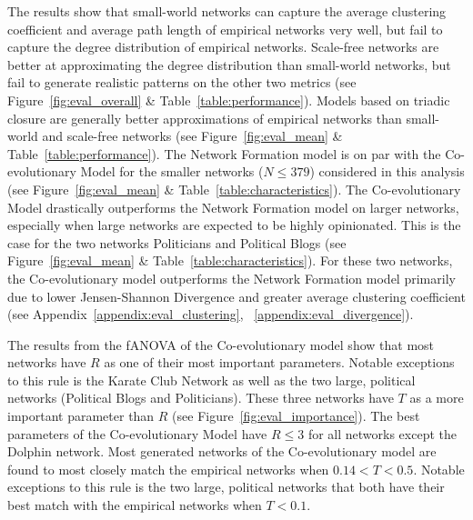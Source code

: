 \documentclass[11pt]{article}
\begin{document}
The results show that small-world networks can capture the average clustering coefficient and average path length of empirical networks very well, but fail to capture the degree distribution of empirical networks. Scale-free networks are better at approximating the degree distribution than small-world networks, but fail to generate realistic patterns on the other two metrics (see Figure~\ref{fig:eval_overall} \& Table~\ref{table:performance}). Models based on triadic closure are generally better approximations of empirical networks than small-world and scale-free networks (see Figure~\ref{fig:eval_mean} \& Table~\ref{table:performance}). The Network Formation model is on par with the Co-evolutionary Model for the smaller networks ($N\leq 379$) considered in this analysis (see Figure~\ref{fig:eval_mean} \& Table~\ref{table:characteristics}). The Co-evolutionary Model drastically outperforms the Network Formation model on larger networks, especially when large networks are expected to be highly opinionated. This is the case for the two networks Politicians and Political Blogs (see Figure~\ref{fig:eval_mean} \& Table~\ref{table:characteristics}). For these two networks, the Co-evolutionary model outperforms the Network Formation model primarily due to lower Jensen-Shannon Divergence and greater average clustering coefficient (see Appendix~\ref{appendix:eval_clustering}, ~\ref{appendix:eval_divergence}).  

\noindent The results from the fANOVA of the Co-evolutionary model show that most networks have $R$ as one of their most important parameters. Notable exceptions to this rule is the Karate Club Network as well as the two large, political networks (Political Blogs and Politicians). These three networks have $T$ as a more important parameter than $R$ (see Figure~\ref{fig:eval_importance}).
The best parameters of the Co-evolutionary Model have $R\leq3$ for all networks except the Dolphin network. Most generated networks of the Co-evolutionary model are found to most closely match the empirical networks when $0.14 < T < 0.5$. Notable exceptions to this rule is the two large, political networks that both have their best match with the empirical networks when $T < 0.1$. 
\end{document}
